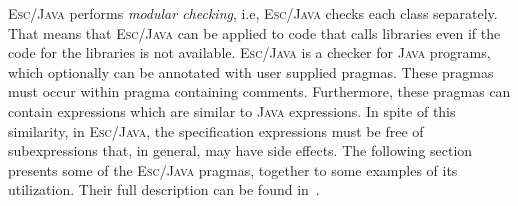\documentclass[a4paper]{llncs}
\begin{document}
\textsc{Esc/Java} performs \textit{modular checking}, i.e,
\textsc{Esc/Java} checks each class separately. That means that
\textsc{Esc/Java} can be applied to code that calls libraries even if
the code for the libraries is not available. \textsc{Esc/Java} is a
checker for \textsc{Java} programs, which optionally can be annotated
with user supplied pragmas. These pragmas must occur within pragma
containing comments. Furthermore, these pragmas can contain
expressions which are similar to \textsc{Java} expressions. In spite
of this similarity, in \textsc{Esc/Java}, the specification
expressions must be free of subexpressions that, in general, may have
side effects. The following section presents some of the
\textsc{Esc/Java} pragmas, together to some examples of its
utilization. Their full description can be found in~\cite{ESCManual}.
\end{document}
